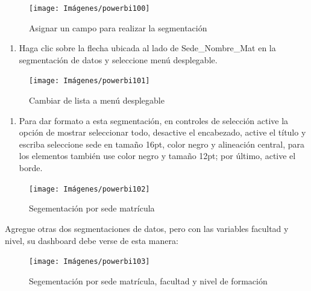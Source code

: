 \documentclass[
]{book}
\providecommand{\tightlist}{%
  \setlength{\itemsep}{0pt}\setlength{\parskip}{0pt}}
\begin{document}
\begin{figure}

{\centering \texttt{[image: Imágenes/powerbi100]} 

}

\caption{Asignar un campo para realizar la segmentación}\label{fig:paso2segmentacion-fig}
\end{figure}

\begin{enumerate}
\def\labelenumi{\arabic{enumi}.}
\setcounter{enumi}{2}
\tightlist
\item
  Haga clic sobre la flecha ubicada al lado de Sede\_Nombre\_Mat en la segmentación de datos y seleccione menú desplegable.
\end{enumerate}

\begin{figure}

{\centering \texttt{[image: Imágenes/powerbi101]} 

}

\caption{Cambiar de lista a menú desplegable}\label{fig:paso3segmentacion-fig}
\end{figure}

\begin{enumerate}
\def\labelenumi{\arabic{enumi}.}
\setcounter{enumi}{3}
\tightlist
\item
  Para dar formato a esta segmentación, en controles de selección active la opción de mostrar seleccionar todo, desactive el encabezado, active el título y escriba seleccione sede en tamaño 16pt, color negro y alineación central, para los elementos también use color negro y tamaño 12pt; por último, active el borde.
\end{enumerate}

\begin{figure}

{\centering \texttt{[image: Imágenes/powerbi102]} 

}

\caption{Segementación por sede matrícula}\label{fig:paso4segmentacion-fig}
\end{figure}

Agregue otras dos segmentaciones de datos, pero con las variables facultad y nivel, su dashboard debe verse de esta manera:

\begin{figure}

{\centering \texttt{[image: Imágenes/powerbi103]} 

}

\caption{Segementación por sede matrícula, facultad y nivel de formación}\label{fig:segmentacionessedefacultadnivel-fig}
\end{figure}
\end{document}
